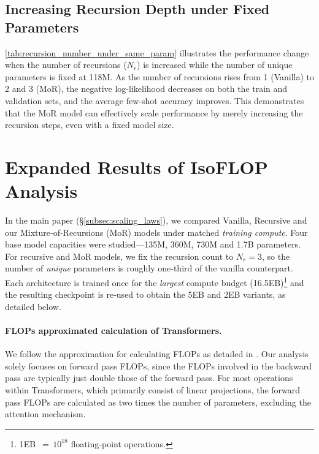 


\subsection{Increasing Recursion Depth under Fixed Parameters}

\autoref{tab:recursion_number_under_same_param} illustrates the performance change when the number of recursions ($N_r$) is increased while the number of unique parameters is fixed at 118M. As the number of recursions rises from 1 (Vanilla) to 2 and 3 (MoR), the negative log-likelihood decreases on both the train and validation sets, and the average few-shot accuracy improves. This demonstrates that the MoR model can effectively scale performance by merely increasing the recursion steps, even with a fixed model size.





\clearpage
\section{Expanded Results of IsoFLOP Analysis}
\label{app:scaling_laws}


In the main paper (\S\ref{subsec:scaling_laws}), we compared Vanilla, Recursive and our Mixture‑of‑Recursions (MoR) models under matched \emph{training compute}. 
Four base model capacities were studied—135M, 360M, 730M and 1.7B parameters. 
For recursive and MoR models, we fix the recursion count to $N_r\!=\!3$, so the number of \emph{unique} parameters is roughly one‑third of the vanilla counterpart.  
Each architecture is trained once for the \emph{largest} compute budget (16.5EB)\footnote{1EB $\,{=}\,10^{18}$ floating‑point operations.} and the resulting checkpoint is re‑used to obtain the 5EB and 2EB variants, as detailed below.


\vspace{-10pt}
\paragraph{FLOPs approximated calculation of Transformers.}

We follow the approximation for calculating FLOPs as detailed in \citet{kaplan2020scaling}. Our analysis solely focuses on forward pass FLOPs, since the FLOPs involved in the backward pass are typically just double those of the forward pass. For most operations within Transformers, which primarily consist of linear projections, the forward pass FLOPs are calculated as two times the number of parameters, excluding the attention mechanism.

